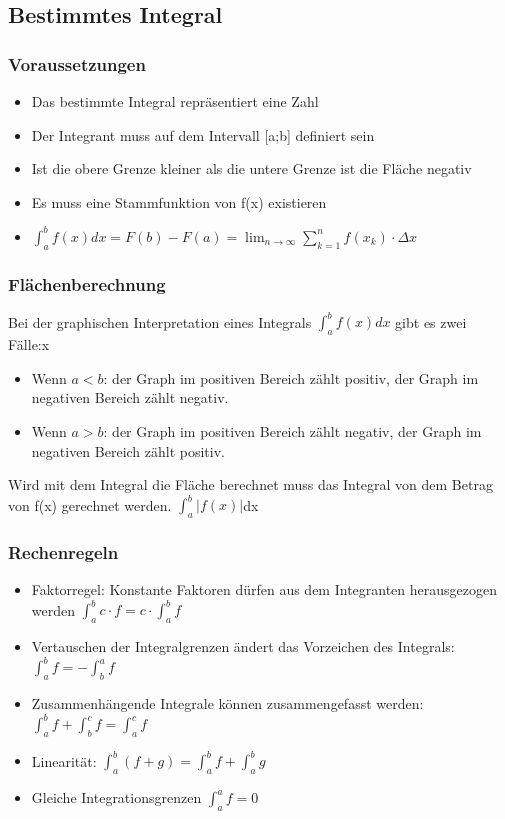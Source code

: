 \subsection{Bestimmtes Integral}
\subsubsection{Voraussetzungen}
\begin{itemize}
	\item Das bestimmte Integral repräsentiert eine Zahl
	\item Der Integrant muss auf dem Intervall [a;b] definiert sein
	\item Ist die obere Grenze kleiner als die untere Grenze ist die Fläche negativ
	\item Es muss eine Stammfunktion von f(x) existieren
	\item $\int_{a}^{b} f(x) dx = F(b) - F(a) =
	\lim_{n \to \infty} \sum_{k=1}^{n}f(x_k) \cdot \Delta x$
\end{itemize}

\subsubsection{Flächenberechnung}
Bei der graphischen Interpretation eines Integrals $\int_{a}^{b}f(x)dx$ gibt es zwei Fälle:x
\begin{itemize}
	\item Wenn $a < b$: der Graph im positiven Bereich zählt positiv, der Graph im negativen Bereich zählt negativ.
	\item Wenn $a > b$: der Graph im positiven Bereich zählt negativ, der Graph im negativen Bereich zählt positiv.
\end{itemize}
Wird mit dem Integral die Fläche berechnet muss das Integral von dem Betrag von f(x) gerechnet werden. $\int_{a}^{b}\vert f(x) \vert$dx

\subsubsection{Rechenregeln}
\begin{itemize}
	\item Faktorregel: Konstante Faktoren dürfen aus dem Integranten herausgezogen werden $\int_{a}^{b}c \cdot f = c \cdot \int_{a}^{b}f$
	
	\item Vertauschen der Integralgrenzen ändert das Vorzeichen des Integrals:
	$\int_{a}^{b}f = - \int_{b}^{a}f$
	\item Zusammenhängende Integrale können zusammengefasst werden:
	$\int_{a}^{b}f + \int_{b}^{c}f = \int_{a}^{c}f$
	\item Linearität: $\int_{a}^{b}(f+g) = \int_{a}^{b}f + \int_{a}^{b}g$
	\item Gleiche Integrationsgrenzen $\int_{a}^{a} f = 0$
\end{itemize}

